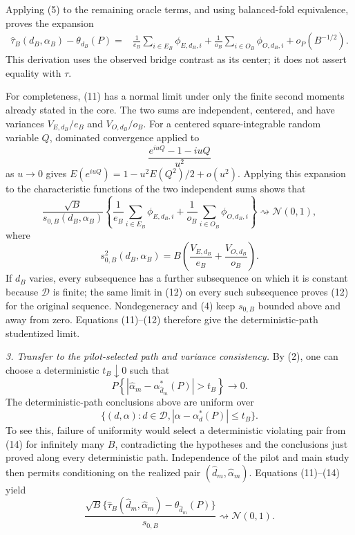 Applying (5) to the remaining oracle terms, and using balanced-fold equivalence, proves the expansion
\[
\begin{aligned}
 \widehat\tau_B(d_B,\alpha_B)-\theta_{d_B}(P)
 ={}&\frac1{e_B}\sum_{i\in E_B}\phi_{E,d_B,i}
 +\frac1{o_B}\sum_{i\in O_B}\phi_{O,d_B,i}
 +o_P(B^{-1/2}).
\end{aligned}
 \tag{11}
\]
This derivation uses the observed bridge contrast as its center; it does not assert equality with \(\tau\).

For completeness, (11) has a normal limit under only the finite second moments already stated in the core.  The two sums are independent, centered, and have variances \(V_{E,d_B}/e_B\) and \(V_{O,d_B}/o_B\).  For a centered square-integrable random variable \(Q\), dominated convergence applied to
\[
 \frac{e^{iuQ}-1-iuQ}{u^2}
\]
as \(u\to0\) gives \(E(e^{iuQ})=1-u^2E(Q^2)/2+o(u^2)\).  Applying this expansion to the characteristic functions of the two independent sums shows that
\[
 \frac{\sqrt B}{s_{0,B}(d_B,\alpha_B)}
 \left\{
 \frac1{e_B}\sum_{i\in E_B}\phi_{E,d_B,i}
 +\frac1{o_B}\sum_{i\in O_B}\phi_{O,d_B,i}
 \right\}
 \rightsquigarrow\mathcal N(0,1),
 \tag{12}
\]
where
\[
 s_{0,B}^2(d_B,\alpha_B)
 =B\left(\frac{V_{E,d_B}}{e_B}+\frac{V_{O,d_B}}{o_B}\right).
\]
If \(d_B\) varies, every subsequence has a further subsequence on which it is constant because \(\mathcal D\) is finite; the same limit in (12) on every such subsequence proves (12) for the original sequence.  Nondegeneracy and (4) keep \(s_{0,B}\) bounded above and away from zero.  Equations (11)--(12) therefore give the deterministic-path studentized limit.

\emph{3. Transfer to the pilot-selected path and variance consistency.}
By (2), one can choose a deterministic \(t_B\downarrow0\) such that
\[
 P\left\{
 |\widehat\alpha_m-\alpha_{\widehat d_m}^*(P)|>t_B
 \right\}\longrightarrow0.
 \tag{13}
\]
The deterministic-path conclusions above are uniform over
\[
 \{(d,\alpha):d\in\mathcal D,
 |\alpha-\alpha_d^*(P)|\le t_B\}.
 \tag{14}
\]
To see this, failure of uniformity would select a deterministic violating pair from (14) for infinitely many \(B\), contradicting the hypotheses and the conclusions just proved along every deterministic path.  Independence of the pilot and main study then permits conditioning on the realized pair \((\widehat d_m,\widehat\alpha_m)\).  Equations (11)--(14) yield
\[
 \frac{\sqrt B\{\widehat\tau_B(\widehat d_m,\widehat\alpha_m)
 -\theta_{\widehat d_m}(P)\}}{s_{0,B}}
 \rightsquigarrow\mathcal N(0,1).
 \tag{15}
\]

